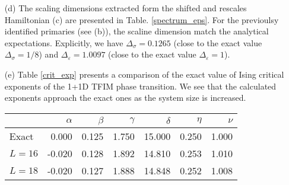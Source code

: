 \documentclass[10pt, a4paper]{article}
\begin{document}
{\begin{enumerate}
  \item[(d)] The scaling dimensions extracted form the shifted and rescales Hamiltonian (c) are presented in Table. \ref{spectrum_eps}. For the previoulsy identified primaries (see (b)), the scaline dimension match the analytical expectations. Explicitly, we have $\Delta_{\sigma} = 0.1265$ (close to the exact value $\Delta_{\sigma} = 1/8$) and $\Delta_{\varepsilon} = 1.0097$ (close to the exact value $\Delta_{\varepsilon} = 1$). 
  \newpage
  \item[(e)] Table \ref{crit_exp} presents a comparison of the exact value of Ising critical exponents \cite{crit_exp} of the 1+1D TFIM phase transition. We see that the calculated exponents approach the exact ones as the system size is increased. 
  \begin{table}
    \centering
    \begin{tabular}{lrrrrrr}
      \toprule
       & $\alpha$ & $\beta$ & $\gamma$ & $\delta$ & $\eta$ & $\nu$ \\
      \midrule
      Exact & 0.000 & 0.125 & 1.750 & 15.000 & 0.250 & 1.000 \\
      $L=16$ & -0.020 & 0.128 & 1.892 & 14.810 & 0.253 & 1.010 \\
      $L=18$ & -0.020 & 0.127 & 1.888 & 14.848 & 0.252 & 1.008 \\
      \bottomrule
      \end{tabular}


\end{table}
\end{enumerate}}
\end{document}
